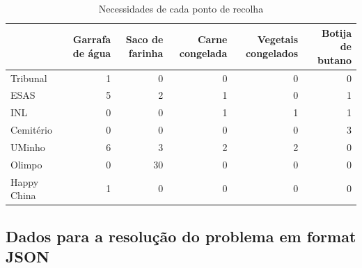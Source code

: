 \documentclass[12pt, a4paper]{article}
\begin{document}
\begin{table}[H]
    \small

    \begin{adjustwidth}{-1.5cm}{-1.5cm}
        \begin{center}
            \begin{tabular}{|l|r|r|r|r|r|}
                \hline
                                    &
                Garrafa de água     &
                Saco de farinha     &
                Carne congelada     &
                Vegetais congelados &
                Botija de butano    \\

                \hline
                Tribunal & 1 & 0 & 0 & 0 & 0 \\
                \hline
                ESAS & 5 & 2 & 1 & 0 & 1 \\
                \hline
                INL & 0 & 0 & 1 & 1 & 1 \\
                \hline
                Cemitério & 0 & 0 & 0 & 0 & 3 \\
                \hline
                UMinho & 6 & 3 & 2 & 2 & 0 \\
                \hline
                Olimpo & 0 & 30 & 0 & 0 & 0 \\
                \hline
                Happy China & 1 & 0 & 0 & 0 & 0 \\
                \hline
            \end{tabular}
        \end{center}
    \end{adjustwidth}

    \caption{Necessidades de cada ponto de recolha}
\end{table}

\subsection{Dados para a resolução do problema em format JSON}
\label{problem-data-json}


\end{document}
